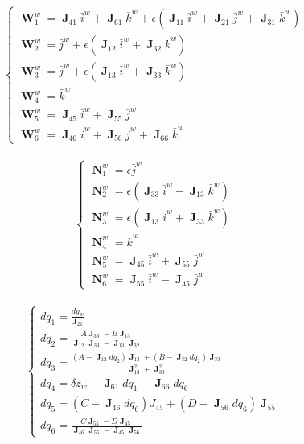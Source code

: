 \documentclass[12pt]{article}
\DeclareMathOperator{\J}{\mathbf{J}}
\DeclareMathOperator{\N}{\mathbf{N}}
\DeclareMathOperator{\W}{\mathbf{W}}
\begin{document}
\begin{align*}
  \begin{cases}
    \W_{1}^w = \J_{41}\bar{i}^w + \J_{61}\bar{k}^w + \epsilon (\J_{11}\bar{i}^w + \J_{21}\bar{j}^w + \J_{31}\bar{k}^w)\\
    \W_{2}^w = \bar{j}^w + \epsilon (\J_{12}\bar{i}^w + \J_{32}\bar{k}^w)\\
    \W_{3}^w = \bar{j}^w + \epsilon (\J_{13}\bar{i}^w + \J_{33}\bar{k}^w)\\
    \W_{4}^w = \bar{k}^w\\
    \W_{5}^w = \J_{45}\bar{i}^w + \J_{55}\bar{j}^w\\
    \W_{6}^w = \J_{46}\bar{i}^w + \J_{56}\bar{j}^w + \J_{66}\bar{k}^w
  \end{cases}
\end{align*}

\begin{align*}
  \begin{cases}
    \N_{1}^w = \epsilon \bar{j}^w\\
    \N_{2}^w = \epsilon (\J_{33}\bar{i}^w - \J_{13}\bar{k}^w)\\
    \N_{3}^w = \epsilon (\J_{13}\bar{i}^w + \J_{33}\bar{k}^w)\\
    \N_{4}^w = \bar{k}^w\\
    \N_{5}^w = \J_{45}\bar{i}^w + \J_{55}\bar{j}^w\\
    \N_{6}^w = \J_{55}\bar{i}^w - \J_{45}\bar{j}^w
  \end{cases}
\end{align*}

\begin{align*}
  \begin{cases}
    dq_1 = \frac{dy_w}{\J_{21}}\\
    dq_2 = \frac{A\J_{33}-B\J_{13}}{\J_{12}\J_{33}-\J_{13}\J_{32}}\\
    dq_3 = \frac{(A-\J_{12}dq_2)\J_{13}+(B-\J_{32}dq_2)\J_{33}}{\J_{13}^2+\J_{33}^2}\\
    dq_4 = \delta z_w-\J_{61}dq_1 - \J_{66}dq_6\\
    dq_5 = (C - \J_{46}dq_6)J_{45} + (D - \J_{56}dq_6)\J_{55}\\
    dq_6 = \frac{C\J_{55}-D\J_{45}}{\J_{46}\J_{55}-\J_{45}\J_{56}}
  \end{cases}
\end{align*}
\end{document}
